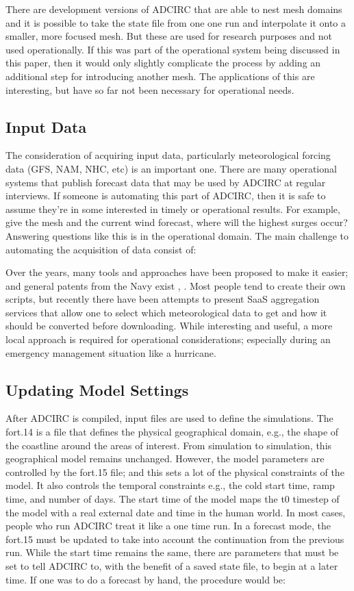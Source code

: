 \documentclass{article}
\begin{document}
There are development versions of ADCIRC that are able to nest mesh domains and
it is possible to take the state file from one one run and interpolate it onto a
smaller, more focused mesh. But these are used for research purposes and not
used operationally. If this was part of the operational system being discussed
in this paper, then it would only slightly complicate the process by adding an
additional step for introducing another mesh. The applications of this are
interesting, but have so far not been necessary for operational needs.

\subsection{Input Data}

The consideration of acquiring input data, particularly meteorological forcing
data (GFS, NAM, NHC, etc) is an important one. There are many operational
systems that publish forecast data that may be used by ADCIRC at regular
interviews. If someone is automating this part of ADCIRC, then it is safe to
assume they're in some interested in timely or operational results. For example,
give the mesh and the current wind forecast, where will the highest surges
occur? Answering questions like this is in the operational domain.  The main
challenge to automating the acquisition of data consist of:

Over the years, many tools and approaches have been proposed to make it easier;
and general patents from the Navy exist \cite{US20140164438A1}, \cite{US8112455B2}.
Most people tend to create their own scripts, but recently there have been
attempts to present SaaS aggregation services that allow one to select which
meteorological data to get and how it should be converted before downloading.
While interesting and useful, a more local approach is required for operational
considerations; especially during an emergency management situation like a
hurricane.

\subsection{Updating Model Settings}

After ADCIRC is compiled, input files are used to define the simulations. The
fort.14 is a file that defines the physical geographical domain, e.g., the shape
of the coastline around the areas of interest. From simulation to simulation,
this geographical model remains unchanged.  However, the model parameters are
controlled by the fort.15 file; and this sets a lot of the physical constraints
of the model. It also controls the temporal constraints e.g., the cold start
time, ramp time, and number of days. The start time of the model maps the t0
timestep of the model with a real external date and time in the human world. In
most cases, people who run ADCIRC treat it like a one time run.  In a forecast
mode, the fort.15 must be updated to take into account the continuation from the
previous run. While the start time remains the same, there are parameters that
must be set to tell ADCIRC to, with the benefit of a saved state file, to begin
at a later time.  If one was to do a forecast by hand, the procedure would be:
\end{document}

